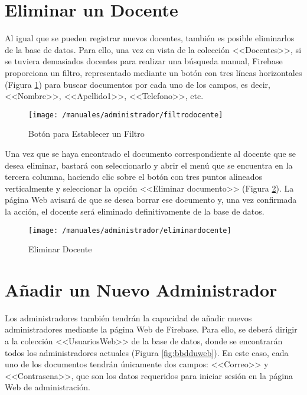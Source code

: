 \section*{Eliminar un Docente}
Al igual que se pueden registrar nuevos docentes, también es posible eliminarlos de la base de datos. Para ello, una vez en vista de la colección <<Docentes>>, si se tuviera demasiados docentes para realizar una búsqueda manual, Firebase proporciona un filtro, representado mediante un botón con tres líneas horizontales (Figura \ref{fig:filtrodocente}) para buscar documentos por cada uno de los campos, es decir, <<Nombre>>, <<Apellido1>>, <<Telefono>>, etc.

\begin{figure}[!h]
	\begin{center}
		\texttt{[image: /manuales/administrador/filtrodocente]}
		\caption{Botón para Establecer un Filtro}
		\label{fig:filtrodocente}
	\end{center}
\end{figure}

\clearpage

Una vez que se haya encontrado el documento correspondiente al docente que se desea eliminar, bastará con seleccionarlo y abrir el menú que se encuentra en la tercera columna, haciendo clic sobre el botón con tres puntos alineados verticalmente y seleccionar la opción <<Eliminar documento>> (Figura \ref{fig:eliminardocente}). La página Web avisará de que se desea borrar ese documento y, una vez confirmada la acción, el docente será eliminado definitivamente de la base de datos.

\begin{figure}[!h]
	\begin{center}
		\texttt{[image: /manuales/administrador/eliminardocente]}
		\caption{Eliminar Docente}
		\label{fig:eliminardocente}
	\end{center}
\end{figure}

\clearpage

\section*{Añadir un Nuevo Administrador}
Los administradores también tendrán la capacidad de añadir nuevos administradores mediante la página Web de Firebase. Para ello, se deberá dirigir a la colección <<UsuariosWeb>> de la base de datos, donde se encontrarán todos los administradores actuales (Figura \ref{fig:bbdduweb}). En este caso, cada uno de los documentos tendrán únicamente dos campos: <<Correo>> y <<Contrasena>>, que son los datos requeridos para iniciar sesión en la página Web de administración.

